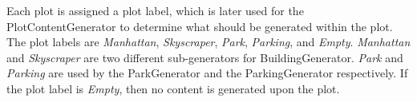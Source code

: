 Each plot is assigned a plot label, which is later used for the PlotContentGenerator to determine what should be generated within the plot.
The plot labels are \textit{Manhattan}, \textit{Skyscraper}, \textit{Park}, \textit{Parking}, and \textit{Empty}.
\textit{Manhattan} and \textit{Skyscraper} are two different sub-generators for BuildingGenerator. 
\textit{Park} and \textit{Parking} are used by the ParkGenerator and the ParkingGenerator respectively.
If the plot label is \textit{Empty}, then no content is generated upon the plot. 

